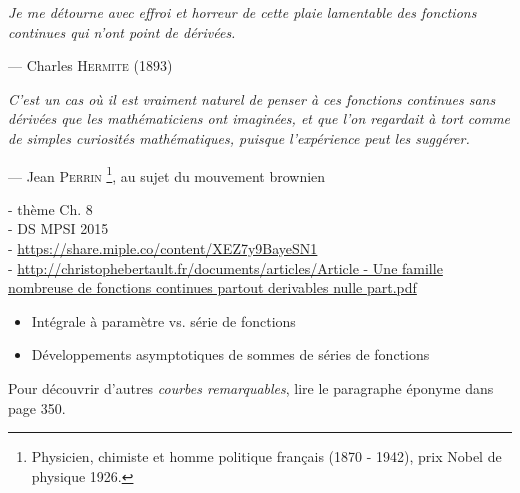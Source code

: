 \epigraph{\emph{Je me détourne avec effroi et horreur de cette plaie lamentable des fonctions continues qui n'ont point de dérivées.}}{--- Charles \textsc{Hermite} (1893)}
    
\epigraph{\emph{C’est un cas où il est vraiment naturel de penser à ces fonctions continues sans dérivées que les mathématiciens ont imaginées, et que l’on regardait à tort comme de simples curiosités mathématiques, puisque l’expérience peut les suggérer.}}{--- Jean \textsc{Perrin} \footnote{Physicien, chimiste et homme politique français (1870 - 1942), prix Nobel de physique 1926.}, au sujet du mouvement brownien}
    
- thème Ch. 8 \\
- DS MPSI 2015 \\
- \url{https://share.miple.co/content/XEZ7y9BayeSN1} \\
- \url{http://christophebertault.fr/documents/articles/Article - Une famille nombreuse de fonctions continues partout derivables nulle part.pdf}

\begin{itemize}
    \item Intégrale à paramètre vs. série de fonctions
    \item Développements asymptotiques de sommes de séries de fonctions
\end{itemize}

\begin{marginfigure}[-5cm]
	
\end{marginfigure}

\begin{marginfigure}[1cm]
	
\end{marginfigure}

Pour découvrir d'autres \emph{courbes remarquables}, lire le paragraphe éponyme dans \cite{contre-exemples} page 350. 